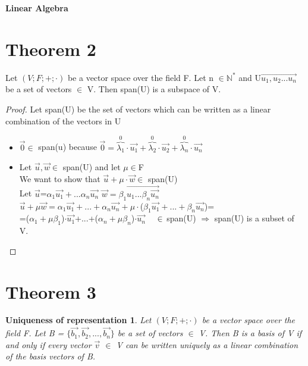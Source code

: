 \documentclass{article}
\newtheorem*{Uniqueness of representation*}{Uniqueness of representation}
\begin{document}
\fontsize{12pt}{12pt}\selectfont
{}
   \begin{center}
      \Large\textbf{Linear Algebra}\\
   \end{center}
\section*{Theorem 2}
Let $(V; F;+;\cdot)$ be a vector space over the field F. Let n $\in \mathbb{N}^*$
and U{$\vec{u_1,u_2...u_n}$} be a set of vectors $\in$ V. Then span(U) is a subspace of V.
\begin{proof}
  Let span(U) be the set of vectors which can be written as a linear combination of the vectors in U
  \begin{itemize}
    \item $\vec{0} \in$ span(u) because $\vec{0}=\overbrace{\lambda_1}^{0}\cdot\vec{u_1}+\overbrace{\lambda_2}^{0}\cdot\vec{u_2}+\overbrace{\lambda_n}^{0}\cdot\vec{u_n}$
    \item Let $\vec{u},\vec{w} \in$ span(U) and let $\mu \in$F\\
    We want to show that $\vec{u}+\mu \cdot \vec{w} \in$ span(U)\\
    Let $\vec{u}$=$\alpha_1\vec{u_1}+...\alpha_n\vec{u_n}$ \hspace{1cm}
    $\vec{w}=\beta_1\vec{u_1...\beta_n\vec{u_n}}$\\
    $\vec{u}+\mu\vec{w}=\alpha_1\vec{u_1}+...+\alpha_n\vec{u_n}+\mu \cdot$($\beta_1\vec{u_1}+...+\beta_n\vec{u_n}$)=\\
    =($\alpha_1+\mu \beta_1$)$\cdot \vec{u_1}$+...+($\alpha_n+\mu \beta_n$)$\cdot \vec{u_n}$$\hspace{0.5cm} \in$ span(U)
    $\Rightarrow$ span(U) is a subset of V.
\end{itemize}
\end{proof}
\setcounter{section}{2}
\section*{Theorem 3}
\begin{Uniqueness of representation*}
\nonumber
Let $(V; F;+;\cdot)$ be a vector space over the field F.
Let B = $\{\vec{b_1},\vec{b_2},...,\vec{b_n}\}$ be a set of vectors $\in$ V. Then B is a basis of V if and only if every vector $\vec{v}$ $\in$ V can be written uniquely as a linear combination of the basis vectors of B.
\end{Uniqueness of representation*}
\end{document}
